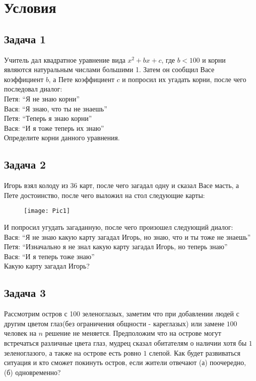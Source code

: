 \section*{Условия}
\subsection*{Задача 1}
	Учитель дал квадратное уравнение вида $x^2 + bx + c$, где $b < 100$ и корни являются натуральным числами большими 1. Затем он сообщил Васе коэффициент $b$, а Пете коэффициент $c$ и попросил их угадать корни, после чего последовал диалог:\\
	Петя: ``Я не знаю корни''\\
	Вася: ``Я знаю, что ты не знаешь''\\
	Петя: ``Теперь я знаю корни''\\
	Вася: ``И я тоже теперь их знаю''\\
	Определите корни данного уравнения.
\vskip 0.4in

\subsection*{Задача 2}
	Игорь взял колоду из 36 карт, после чего загадал одну и сказал Васе масть, а Пете достоинство, после чего выложил на стол следующие карты:\\
	\begin{figure}[!h]
		\texttt{[image: Pic1]}
	\end{figure}
	\vskip 0.1in
	И попросил угудать загаданную, после чего произошел следующий диалог:\\
	Вася: ``Я не знаю какую карту загадал Игорь, но знаю, что и ты тоже не знаешь''\\
	Петя: ``Изначально я не знал какую карту загадал Игорь, но теперь знаю''\\
	Вася: ``И я теперь тоже знаю''\\
	Какую карту загадал Игорь?
\vskip 0.4in

\subsection*{Задача 3}
	Рассмотрим остров с 100 зеленоглазых, заметим что при добавлении людей с другим цветом глаз(без ограничения общности - кареглазых) или замене $100$ человек на $n$ решение не меняется. Предположим что на острове могут встречаться различные цвета глаз, мудрец сказал обитателям о наличии хотя бы $1$ зеленоглазого, а также на острове есть ровно $1$ слепой. Как будет развиваться ситуация и кто сможет покинуть остров, если жители отвечают (а) поочередно, (б) одновременно?

